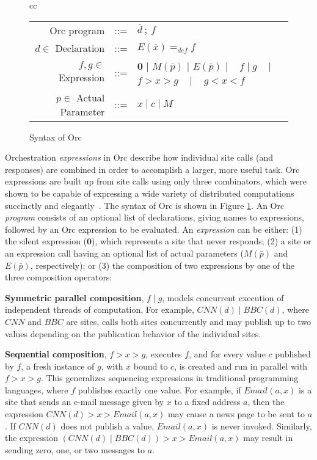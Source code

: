 \documentclass{eptcs}
\begin{document}
\begin{figure}
	\centering
	\begin{small}
\begin{tabular}{cc}		
	\begin{tabular}{rcl}
	        Orc program  & ::= & $\bar{d} ~;~ f$ \\
	$d \in$ Declaration  & ::= & $E(\bar{x}) =_{def} f$ \\
	$f,g \in$ Expression & ::= & $\mathbf{0}$ $|$ $M(\bar{p})$ $|$ $E(\bar{p})$
						 $|\;\;\;$    $f \;|\; g$ 
						  $\;\;\;|\;\;\;$    $f > x > g$ 
						  $\;\;\;|\;\;\;$    $g < x < f$ \\
	$p \in$ Actual Parameter & ::= & $x \;|\; c \;|\; M$ \\
	\end{tabular}
\end{tabular}
\end{small}
	\caption{Syntax of Orc}
	\label{fig:syntax}
\end{figure}

Orchestration \emph{expressions} in Orc describe how individual site calls (and responses) are combined in order to accomplish a larger, more useful task. Orc expressions are built up from site calls using only three combinators, which were shown to be capable of expressing a wide variety of distributed computations succinctly and elegantly~\cite{OrcTheory05}. 
The syntax of Orc is shown in Figure \ref{fig:syntax}. An Orc \emph{program} consists of an optional list of declarations, giving names to expressions, followed 
by an Orc expression to be evaluated. 
An \emph{expression} can be either: (1) the silent expression ($\mathbf{0}$), 
which represents a site that never responds; (2) a site or an expression call having 
an optional list of actual parameters ($M(\bar{p})$ and $E(\bar{p})$, respectively); or (3) the composition of two expressions by one of the three composition operators: 

\textbf{Symmetric parallel composition}, $f \;|\; g$, models concurrent execution of independent threads of computation. For example, $\mathit{CNN}(d) \;|\; \mathit{BBC}(d)$, where $\mathit{CNN}$ and $\mathit{BBC}$ are sites, calls both sites concurrently and may publish up to two values depending on the publication behavior of the individual sites.

\textbf{Sequential composition}, $f > x > g$, executes $f$, and for every value $c$ published by $f$, a fresh instance of $g$, with $x$ bound to $c$, is created  and run in parallel with $f > x > g$. This generalizes sequencing expressions in traditional programming languages, where $f$ publishes exactly one value. For example, if $\mathit{Email}(a, x)$ is a site that sends an e-mail message given by $x$ to a fixed address $a$, then the expression $\mathit{CNN}(d) > x > \mathit{Email}(a, x)$ may cause a news page to be sent to $a$. If $\mathit{CNN}(d)$  does not publish a value, $\mathit{Email}(a, x)$ is never invoked. Similarly, the expression $(\mathit{CNN}(d) \;|\; \mathit{BBC}(d)) > x > \mathit{Email}(a, x)$ may result in sending zero, one, or two messages to $a$. 
\end{document}
